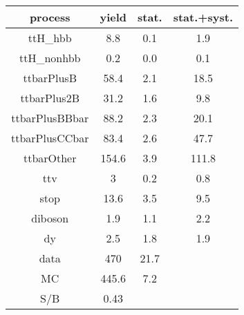 \begin{tabular}{cccc}
\hline
    process     &  yield  &  stat.  &  stat.+syst.  \\
\hline
    ttH\_hbb     &   8.8   &   0.1   &      1.9      \\
   ttH\_nonhbb   &   0.2   &   0.0   &      0.1      \\
   ttbarPlusB   &  58.4   &   2.1   &     18.5      \\
  ttbarPlus2B   &  31.2   &   1.6   &      9.8      \\
 ttbarPlusBBbar &  88.2   &   2.3   &     20.1      \\
 ttbarPlusCCbar &  83.4   &   2.6   &     47.7      \\
   ttbarOther   &  154.6  &   3.9   &     111.8     \\
      ttv       &    3    &   0.2   &      0.8      \\
      stop      &  13.6   &   3.5   &      9.5      \\
    diboson     &   1.9   &   1.1   &      2.2      \\
       dy       &   2.5   &   1.8   &      1.9      \\
\hline
      data      &   470   &  21.7   &               \\
       MC       &  445.6  &   7.2   &               \\
\hline
      S/B       &  0.43   &         &               \\
\hline
\end{tabular}
